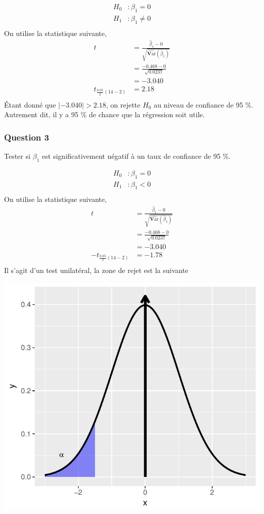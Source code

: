 \documentclass[11pt,french]{report}
\newcommand{\Var}{\mathrm{\textbf{V}ar}}
\begin{document}
\begin{align*}
H_0 &: \beta_1 = 0\\
H_1 &: \beta_1 \neq 0 \\
\end{align*}
On utilise la statistique suivante,
\begin{align*}
t &= \frac{\hat{\beta}_1 - 0 }{\sqrt{\widehat{\Var}(\hat{\beta}_1)}} \\
&= \frac{-0.468 - 0}{\sqrt{0.0237}}\\
&= -3.040\\
t_{\frac{0.05}{2}(14-2)} &= 2.18\\
\end{align*}
Étant donné que $|-3.040| > 2.18$, on rejette $H_0$ au niveau de confiance de 95 \%. Autrement dit, il y a 95 \% de chance que la régression soit utile.

\subsubsection*{Question 3}
Tester si $\beta_1$ est significativement négatif à un taux de confiance de 95 \%.

\begin{align*}
H_0 &: \beta_1 = 0\\
H_1 &: \beta_1 < 0 \\
\end{align*}
On utilise la statistique suivante,
\begin{align*}
t &= \frac{\hat{\beta}_1 - 0 }{\sqrt{\widehat{\Var}(\hat{\beta}_1)}} \\
&= \frac{-0.468 - 0}{\sqrt{0.0237}} \\
&= -3.040 \\
-t_{\frac{0.05}{2}(14-2)} &= -1.78 \\
\end{align*}
Il s'agit d'un test unilatéral, la zone de rejet est la suivante

\includegraphics{notes_de_cours-016}
\end{document}
